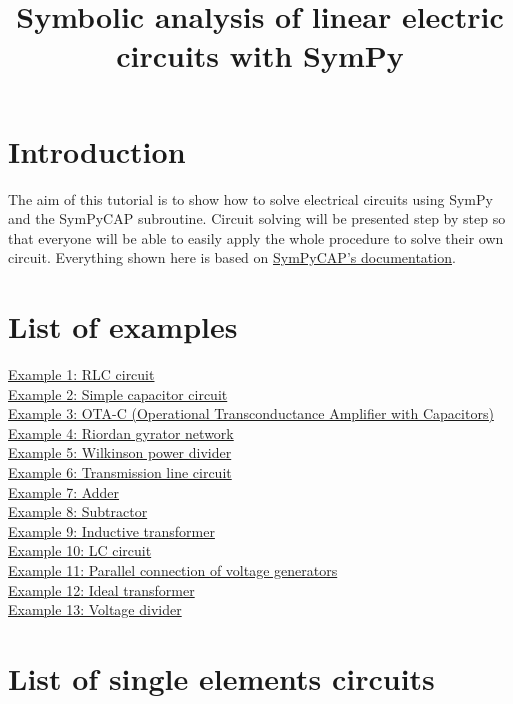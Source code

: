 \documentclass[11pt]{article}
\title{Symbolic analysis of linear electric circuits with
SymPy}
\date{}
\begin{document}
    
    \maketitle
    
    


    \hypertarget{introduction}{%
\section*{Introduction}\label{introduction}}

The aim of this tutorial is to show how to solve electrical circuits
using SymPy and the SymPyCAP subroutine. Circuit solving will be
presented step by step so that everyone will be able to easily apply the
whole procedure to solve their own circuit. Everything shown here is
based on \href{https://github.com/mdodovic/SymPyCAP/blob/main/documentation/Documentation.pdf}{SymPyCAP's documentation}.

    \hypertarget{list-of-examples}{%
\section*{List of examples}\label{list-of-examples}}

\hyperref[example1]{Example 1: RLC circuit}\\
\hyperref[example2]{Example 2: Simple capacitor circuit}\\
\hyperref[example3]{Example 3: OTA-C (Operational Transconductance Amplifier with Capacitors)}\\
\hyperref[example4]{Example 4: Riordan gyrator network}\\
\hyperref[example5]{Example 5: Wilkinson power divider}\\
\hyperref[example6]{Example 6: Transmission line circuit}\\
\hyperref[example7]{Example 7: Adder}\\
\hyperref[example8]{Example 8: Subtractor}\\
\hyperref[example9]{Example 9: Inductive transformer}\\
\hyperref[example10]{Example 10: LC circuit}\\
\hyperref[example11]{Example 11: Parallel connection of voltage generators}\\
\hyperref[example12]{Example 12: Ideal transformer}\\
\hyperref[example13]{Example 13: Voltage divider}

\hypertarget{list-of-single-elements-circuits}{%
\section*{List of single elements
circuits}\label{list-of-single-elements-circuits}}
\end{document}
